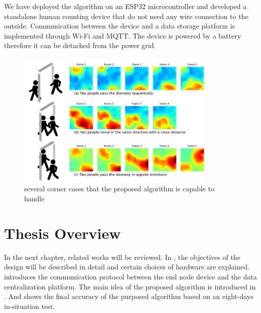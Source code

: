 We have deployed the algorithm on an ESP32 microcontroller and developed a standalone human counting device that do not need any wire connection to the outside. Communication between the device and a data storage platform is implemented through Wi-Fi and MQTT. The device is powered by a battery therefore it can be detached from the power grid.
\begin{figure}
  \centering
  \includegraphics[width=0.85\textwidth]{figures/cornercases.PNG}
  \caption{several corner cases that the proposed algorithm is capable to handle}\label{fig:cornercases}
\end{figure}

\section{Thesis Overview}
In the next chapter, related works will be reviewed. In , the objectives of the design will be described in detail and certain choices of hardware are explained.  introduces the communication protocol between the end node device and the data centralization platform. The main idea of the proposed algorithm is introduced in . And  shows the final accuracy of the purposed algorithm based on an eight-days in-situation test.




